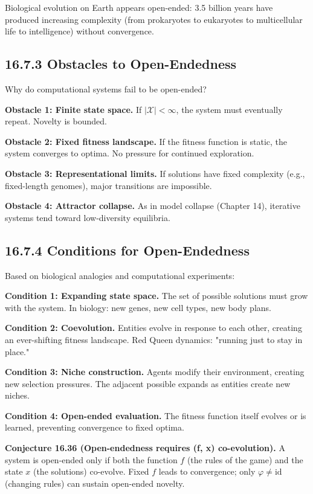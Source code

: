 \begin{observation}
Biological evolution on Earth appears open-ended: 3.5 billion years have produced increasing complexity (from prokaryotes to eukaryotes to multicellular life to intelligence) without convergence.
\end{observation}

\subsection{16.7.3 Obstacles to Open-Endedness}

Why do computational systems fail to be open-ended?

\textbf{Obstacle 1: Finite state space.} If $|\mathcal{X}| < \infty$, the system must eventually repeat. Novelty is bounded.

\textbf{Obstacle 2: Fixed fitness landscape.} If the fitness function is static, the system converges to optima. No pressure for continued exploration.

\textbf{Obstacle 3: Representational limits.} If solutions have fixed complexity (e.g., fixed-length genomes), major transitions are impossible.

\textbf{Obstacle 4: Attractor collapse.} As in model collapse (Chapter 14), iterative systems tend toward low-diversity equilibria.

\subsection{16.7.4 Conditions for Open-Endedness}

Based on biological analogies and computational experiments:

\textbf{Condition 1: Expanding state space.} The set of possible solutions must grow with the system. In biology: new genes, new cell types, new body plans.

\textbf{Condition 2: Coevolution.} Entities evolve in response to each other, creating an ever-shifting fitness landscape. Red Queen dynamics: "running just to stay in place."

\textbf{Condition 3: Niche construction.} Agents modify their environment, creating new selection pressures. The adjacent possible expands as entities create new niches.

\textbf{Condition 4: Open-ended evaluation.} The fitness function itself evolves or is learned, preventing convergence to fixed optima.

\textbf{Conjecture 16.36 (Open-endedness requires (f, x) co-evolution).} A system is open-ended only if both the function $f$ (the rules of the game) and the state $x$ (the solutions) co-evolve. Fixed $f$ leads to convergence; only $\varphi \neq \text{id}$ (changing rules) can sustain open-ended novelty.



